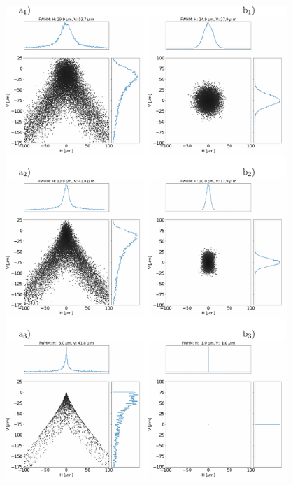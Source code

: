 \documentclass{iucr}              %
\begin{document}
\begin{figure}\label{fig:als}
\includegraphics[width=0.95\textwidth]{figures/fig4.pdf}
% 
% 
% 

\end{figure}
\end{document}
